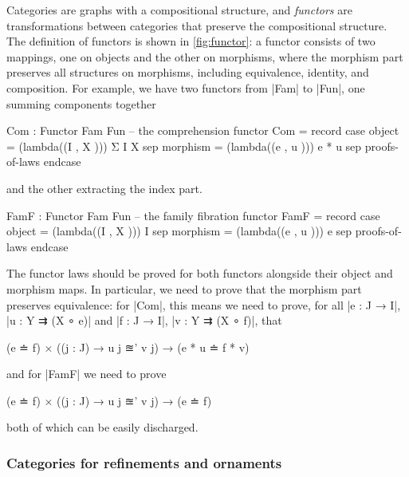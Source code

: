 Categories are graphs with a compositional structure, and \emph{functors} are transformations between categories that preserve the compositional structure.
The definition of functors is shown in \autoref{fig:functor}: a functor consists of two mappings, one on objects and the other on morphisms, where the morphism part preserves all structures on morphisms, including equivalence, identity, and composition.
For example, we have two functors from |Fam| to |Fun|, one summing components together
\begin{code}
Com : Functor Fam Fun  -- the comprehension functor
Com = record  case  object    =  (lambda((I  ,  X  )))  Σ I X
              sep   morphism  =  (lambda((e  ,  u  )))  e * u
              sep   proofs-of-laws endcase
\end{code}
and the other extracting the index part.
\begin{code}
FamF : Functor Fam Fun  -- the family fibration functor
FamF = record  case  object    =  (lambda((I  ,  X  )))  I
               sep   morphism  =  (lambda((e  ,  u  )))  e
               sep   proofs-of-laws endcase
\end{code}
The functor laws should be proved for both functors alongside their object and morphism maps.
In particular, we need to prove that the morphism part preserves equivalence: for |Com|, this means we need to prove, for all |e : J → I|, |u : Y ⇉ (X ∘ e)| and |f : J → I|, |v : Y ⇉ (X ∘ f)|, that
\begin{code}
(e ≐ f) × ((j : J) → u {j} ≊' v {j}) → (e * u ≐ f * v)
\end{code}
and for |FamF| we need to prove
\begin{code}
(e ≐ f) × ((j : J) → u {j} ≊' v {j}) → (e ≐ f)
\end{code}
both of which can be easily discharged.

\subsubsection{Categories for refinements and ornaments}

